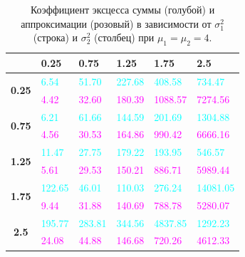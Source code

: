 \documentclass[specialist, substylefile = spbu.rtx,
subf,href,colorlinks=true, 12pt]{disser}
\begin{document}
\begin{table}[!hhh]
	\centering
	\caption{Коэффициент эксцесса суммы (голубой) и аппроксимации (розовый) в зависимости от $\sigma_{1}^{2}$ (строка) и $\sigma_{2}^{2}$ (столбец) при $\mu_{1} = \mu_{2} = 4$.}
	\label{tab8}
	\begin{tabular}{|c|l|l|l|l|l|}
		\hline
		& \textbf{0.25} & \textbf{0.75} & \textbf{1.25} & \textbf{1.75} & \textbf{2.5} \\ \hline
		\multirow{2}{*}{\textbf{0.25}} & \textcolor{cyan}{6.54}          & \textcolor{cyan}{51.70}         & \textcolor{cyan}{227.68}        & \textcolor{cyan}{408.58}        & \textcolor{cyan}{734.47}       \\ \cline{2-6} 
		& \textcolor{magenta}{4.42}          & \textcolor{magenta}{32.60}         & \textcolor{magenta}{180.39}        & \textcolor{magenta}{1088.57}       & \textcolor{magenta}{7274.56}      \\ \hline
		\multirow{2}{*}{\textbf{0.75}} & \textcolor{cyan}{6.21}          & \textcolor{cyan}{61.66}         & \textcolor{cyan}{144.59}        & \textcolor{cyan}{201.69}        & \textcolor{cyan}{1304.88}      \\ \cline{2-6} 
		& \textcolor{magenta}{4.56}          & \textcolor{magenta}{30.53}         & \textcolor{magenta}{164.86}        & \textcolor{magenta}{990.42}        & \textcolor{magenta}{6666.16}      \\ \hline
		\multirow{2}{*}{\textbf{1.25}} & \textcolor{cyan}{11.47}         & \textcolor{cyan}{27.75}         & \textcolor{cyan}{179.22}        & \textcolor{cyan}{193.95}        & \textcolor{cyan}{546.57}       \\ \cline{2-6} 
		& \textcolor{magenta}{5.61}          & \textcolor{magenta}{29.53}         & \textcolor{magenta}{150.21}        & \textcolor{magenta}{886.71}        & \textcolor{magenta}{5989.44}      \\ \hline
		\multirow{2}{*}{\textbf{1.75}} & \textcolor{cyan}{122.65}        & \textcolor{cyan}{46.01}         & \textcolor{cyan}{110.03}        & \textcolor{cyan}{276.24}        & \textcolor{cyan}{14081.05}     \\ \cline{2-6} 
		& \textcolor{magenta}{9.44}          & \textcolor{magenta}{31.88}         & \textcolor{magenta}{140.69}        & \textcolor{magenta}{788.78}        & \textcolor{magenta}{5280.07}      \\ \hline
		\multirow{2}{*}{\textbf{2.5}}  & \textcolor{cyan}{195.77}        & \textcolor{cyan}{283.81}        & \textcolor{cyan}{344.56}        & \textcolor{cyan}{4837.85}       & \textcolor{cyan}{1292.23}      \\ \cline{2-6} 
		& \textcolor{magenta}{24.08}         & \textcolor{magenta}{44.88}         & \textcolor{magenta}{146.68}        & \textcolor{magenta}{720.26}        & \textcolor{magenta}{4612.33}      \\ \hline
	\end{tabular}
\end{table}
\end{document}
